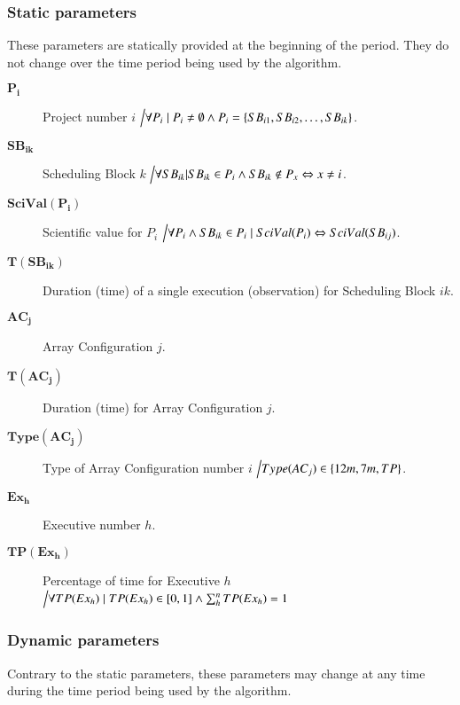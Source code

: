 \subsubsection{Static parameters}
These parameters are statically provided at the beginning of the period. They do not change over the time period being used by the algorithm.

\begin{description}
\item[$\mathbf{P_i}$] Project number $i$ $\Big\slash \forall P_i \mid P_i \neq \emptyset \land P_i = \{SB_{i1}, SB_{i2}, \ldots, SB_{ik}\}$.

\item[$\mathbf{SB_{ik}}$] Scheduling Block $k$ $\Big\slash \forall SB_{ik} | SB_{ik} \in P_i \land SB_{ik} \notin P_x \Leftrightarrow x \neq i$.

\item[$\mathbf{SciVal(P_i)}$] Scientific value for $P_i$ $\Big\slash \forall P_i \land SB_{ik} \in P_i \mid SciVal(P_i) \Leftrightarrow SciVal(SB_{ij}) $.

\item[$\mathbf{T(SB_{ik})}$] Duration (time) of a single execution (observation) for Scheduling Block $ik$.

\item[$\mathbf{AC_j}$] Array Configuration $j$.

\item[$\mathbf{T(AC_j)}$] Duration (time) for Array Configuration $j$.

\item[$\mathbf{Type(AC_j)}$] Type of Array Configuration number $i$ $\Big\slash Type(AC_j) \in \{12m, 7m, TP\}$.

\item[$\mathbf{Ex_h}$] Executive number $h$.

\item[$\mathbf{TP(Ex_h)}$] Percentage of time for Executive $h$ $\Big\slash \forall TP(Ex_h) \mid TP(Ex_h) \in {[0,1]} \land \sum_{h}^{n} TP(Ex_h) = 1$ 

\end{description} 

\subsubsection{Dynamic parameters}
Contrary to the static parameters, these parameters may change at any time during the time period being used by the algorithm.

